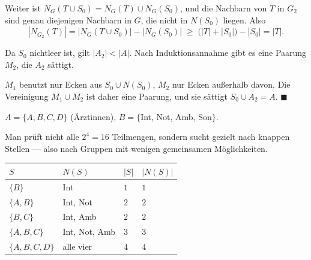 \begin{merksatz}
Weiter ist $N_G(T \cup S_0) = N_G(T) \cup N_G(S_0)$, und die Nachbarn von $T$ in $G_2$ sind genau diejenigen Nachbarn in $G$, die nicht in $N(S_0)$ liegen. Also
\[ |N_{G_2}(T)| = |N_G(T \cup S_0)| - |N_G(S_0)| \;\ge\; \bigl(|T| + |S_0|\bigr) - |S_0| = |T| . \]

Da $S_0$ nichtleer ist, gilt $|A_2| < |A|$. Nach Induktionsannahme gibt es eine Paarung $M_2$, die $A_2$ sättigt.

$M_1$ benutzt nur Ecken aus $S_0 \cup N(S_0)$, $M_2$ nur Ecken außerhalb davon. Die Vereinigung $M_1 \cup M_2$ ist daher eine Paarung, und sie sättigt $S_0 \cup A_2 = A$. $\blacksquare$
\end{merksatz}

\begin{merksatz}
$A = \{A, B, C, D\}$ (Ärztinnen), $B = \{$Int, Not, Amb, Son$\}$.

\begin{center}
\end{center}

Man prüft nicht alle $2^4 = 16$ Teilmengen, sondern sucht gezielt nach knappen Stellen --- also nach Gruppen mit wenigen gemeinsamen Möglichkeiten.

\begin{center}
{\small
\renewcommand{\arraystretch}{1.42}
\begin{tabular}{@{}P{2.0cm}P{2.4cm}P{1.2cm}P{1.4cm}@{}}
\toprule
$S$ & $N(S)$ & $|S|$ & $|N(S)|$\\
\midrule
$\{B\}$ & Int & $1$ & $1$\\
$\{A,B\}$ & Int, Not & $2$ & $2$\\
$\{B,C\}$ & Int, Amb & $2$ & $2$\\
$\{A,B,C\}$ & Int, Not, Amb & $3$ & $3$\\
$\{A,B,C,D\}$ & alle vier & $4$ & $4$\\
\bottomrule
\end{tabular}}
\end{center}


\end{merksatz}
